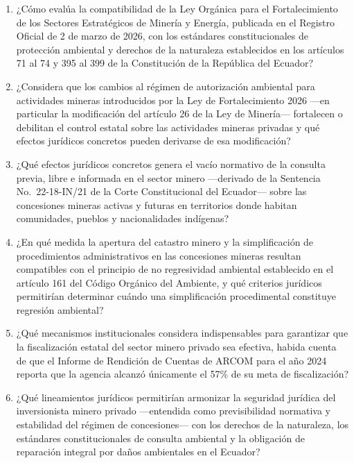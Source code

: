 \begin{enumerate}
    \item ¿Cómo evalúa la compatibilidad de la Ley Orgánica para el Fortalecimiento de los Sectores Estratégicos de Minería y Energía, publicada en el Registro Oficial de 2 de marzo de 2026, con los estándares constitucionales de protección ambiental y derechos de la naturaleza establecidos en los artículos 71 al 74 y 395 al 399 de la Constitución de la República del Ecuador?

    \item ¿Considera que los cambios al régimen de autorización ambiental para actividades mineras introducidos por la Ley de Fortalecimiento 2026 ---en particular la modificación del artículo 26 de la Ley de Minería--- fortalecen o debilitan el control estatal sobre las actividades mineras privadas y qué efectos jurídicos concretos pueden derivarse de esa modificación?

    \item ¿Qué efectos jurídicos concretos genera el vacío normativo de la consulta previa, libre e informada en el sector minero ---derivado de la Sentencia No.\ 22-18-IN/21 de la Corte Constitucional del Ecuador--- sobre las concesiones mineras activas y futuras en territorios donde habitan comunidades, pueblos y nacionalidades indígenas?

    \item ¿En qué medida la apertura del catastro minero y la simplificación de procedimientos administrativos en las concesiones mineras resultan compatibles con el principio de no regresividad ambiental establecido en el artículo 161 del Código Orgánico del Ambiente, y qué criterios jurídicos permitirían determinar cuándo una simplificación procedimental constituye regresión ambiental?

    \item ¿Qué mecanismos institucionales considera indispensables para garantizar que la fiscalización estatal del sector minero privado sea efectiva, habida cuenta de que el Informe de Rendición de Cuentas de ARCOM para el año 2024 reporta que la agencia alcanzó únicamente el 57\% de su meta de fiscalización?

    \item ¿Qué lineamientos jurídicos permitirían armonizar la seguridad jurídica del inversionista minero privado ---entendida como previsibilidad normativa y estabilidad del régimen de concesiones--- con los derechos de la naturaleza, los estándares constitucionales de consulta ambiental y la obligación de reparación integral por daños ambientales en el Ecuador?
\end{enumerate}

